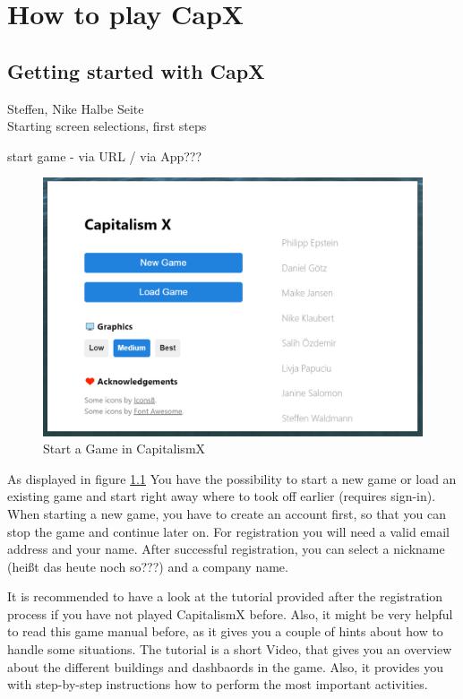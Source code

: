 \documentclass[11pt,titlepage,oneside,openany]{book}
\begin{document}
\chapter{How to play CapX}

\section{Getting started with CapX}
Steffen, Nike Halbe Seite\\

Starting screen selections, first steps

start game - via URL / via App???

\begin{figure} [!htbp]
    \centering
    \includegraphics [width=\textwidth] {images/startingScreen.png}
    \caption{Start a Game in CapitalismX}
    \label{fig:startingScreen}
\end{figure}

As displayed in figure \ref{fig:startingScreen} You have the possibility to start a new game or load an existing game and start right away where to took off earlier (requires sign-in). When starting a new game, you have to create an account first, so that you can stop the game and continue later on. For registration you will need a valid email address and your name. After successful registration, you can select a nickname (heißt das heute noch so???) and a company name. 

It is recommended to have a look at the tutorial provided after the registration process if you have not played CapitalismX before. Also, it might be very helpful to read this game manual before, as it gives you a couple of hints about how to handle some situations. The tutorial is a short Video, that gives you an overview about the different buildings and dashbaords in the game. Also, it provides you with step-by-step instructions how to perform the most important activities.
\end{document}

